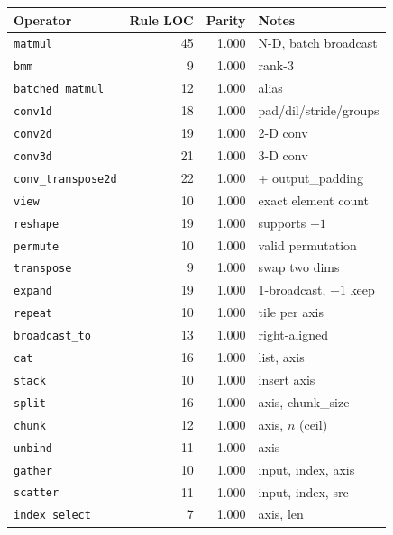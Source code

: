 \begin{table}[h]
\centering
\small
\setlength{\tabcolsep}{4pt}
\begin{tabular}{lrrl}
\toprule
Operator & Rule LOC & Parity & Notes \\
\midrule
\texttt{matmul}                       & 45 & 1.000 & N-D, batch broadcast \\
\texttt{bmm}                          &  9 & 1.000 & rank-3 \\
\texttt{batched\_matmul}              & 12 & 1.000 & alias \\
\texttt{conv1d}                       & 18 & 1.000 & pad/dil/stride/groups \\
\texttt{conv2d}                       & 19 & 1.000 & 2-D conv \\
\texttt{conv3d}                       & 21 & 1.000 & 3-D conv \\
\texttt{conv\_transpose2d}            & 22 & 1.000 & + output\_padding \\
\texttt{view}                         & 10 & 1.000 & exact element count \\
\texttt{reshape}                      & 19 & 1.000 & supports $-1$ \\
\texttt{permute}                      & 10 & 1.000 & valid permutation \\
\texttt{transpose}                    &  9 & 1.000 & swap two dims \\
\texttt{expand}                       & 19 & 1.000 & 1-broadcast, $-1$ keep \\
\texttt{repeat}                       & 10 & 1.000 & tile per axis \\
\texttt{broadcast\_to}                & 13 & 1.000 & right-aligned \\
\texttt{cat}                          & 16 & 1.000 & list, axis \\
\texttt{stack}                        & 10 & 1.000 & insert axis \\
\texttt{split}                        & 16 & 1.000 & axis, chunk\_size \\
\texttt{chunk}                        & 12 & 1.000 & axis, $n$ (ceil) \\
\texttt{unbind}                       & 11 & 1.000 & axis \\
\texttt{gather}                       & 10 & 1.000 & input, index, axis \\
\texttt{scatter}                      & 11 & 1.000 & input, index, src \\
\texttt{index\_select}                &  7 & 1.000 & axis, len \\

\end{tabular}
\end{table}
